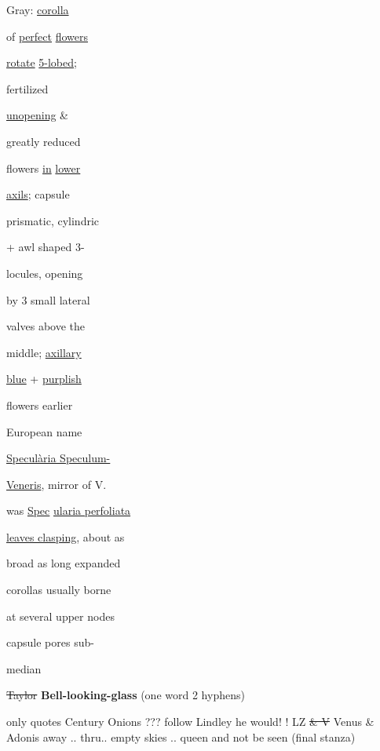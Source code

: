 \documentclass[a4paper]{article}
\begin{document}
\color{blue}
\begin{minipage}[t]{0.3\textwidth}
\setul{}{2pt}
Gray: \ul{corolla}\par
of \ul{perfect} \ul{flowers}\par
\ul{rotate} \ul{5-lobed};\par
fertilized\par
\ul{unopening} \&\par
greatly reduced\par
flowers \ul{in} \ul{lower}\par
\ul{axils}; capsule\par
prismatic, cylindric\par
+ awl shaped 3-\par
locules, opening\par
by 3 small lateral\par
valves above the\par
middle; \ul{axillary}\par
\ul{blue} + \ul{purplish}\par %
flowers earlier\par
European name\par
\setul{}{1pt}
\ul{Specul\`aria Speculum-}\par
\ul{Veneris}, mirror of V.\par
\setul{}{2pt}
was \ul{Spec}
\setul{}{1pt}
\ul{ularia perfoliata}\par
\setul{}{2pt}
\ul{leaves clasping}, about as\par
broad as long expanded\par
corollas usually borne\par
at several upper nodes\par
capsule pores sub-\par
median\par

\sout{Taylor}
\color{red}
\textbf{Bell-looking-glass}
(one word
2 hyphens)

only
quotes Century
Onions ???
\color{blue}
follow Lindley
he would!
! LZ
\sout{\& V}
Venus \& Adonis
away .. thru..
empty skies .. queen
and not be seen
(final stanza)
\end{minipage}
\hfill
\end{document}
